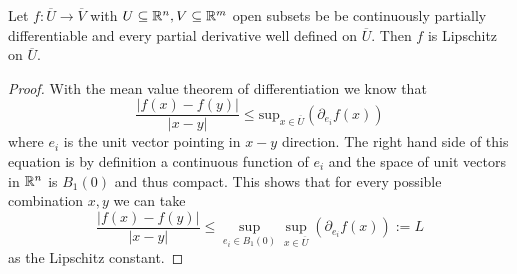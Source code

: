 \begin{lemma}
	\label{5-Zeroes-Lem-Lipschitz-Continuity-Differentiable}
	Let $f:\overline{U}\rightarrow \overline{V}$ with $U\subseteq\mathbb{R}^n,V\subseteq\mathbb{R}^m$ open subsets be be continuously partially differentiable and every partial derivative well defined on $\overline{U}$.
	Then $f$ is Lipschitz on $\overline{U}$.
\end{lemma}
\begin{proof}
	With the mean value theorem of differentiation we know that
	\begin{equation}
		\frac{|f(x)-f(y)|}{|x-y|}\leq \mathrm{sup}_{x\in\overline{U}}\left(\partial_{e_i}f(x)\right)
	\end{equation}
	where $e_i$ is the unit vector pointing in $x-y$ direction.
	The right hand side of this equation is by definition a continuous function of $e_i$ and the space of unit vectors in $\mathbb{R}^n$ is $B_1(0)$ and thus compact.
	This shows that for every possible combination $x,y$ we can take
	\begin{equation}
		\frac{|f(x)-f(y)|}{|x-y|}\leq \sup_{e_i\in B_1(0)}\sup_{x\in\overline{U}}\left(\partial_{e_i}f(x)\right):=L
	\end{equation}
	as the Lipschitz constant.
\end{proof}
% 
% 

